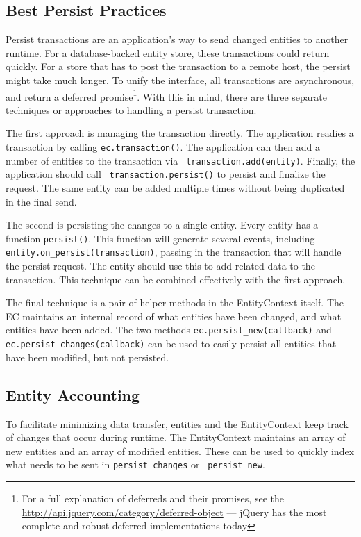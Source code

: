 \documentclass{article}
\newcommand{\ilcode}{\tt}
\begin{document}
\subsection{Best Persist Practices}

Persist transactions are an application's way to send changed entities to
another runtime. For a database-backed entity store, these transactions could
return quickly. For a store that has to post the transaction to a remote host,
the persist might take much longer. To unify the interface, all transactions are
asynchronous, and return a deferred promise\footnote{For a full explanation of
deferreds and their promises, see the \hyperref[jQuery documentation]
{http://api.jquery.com/category/deferred-object} --- jQuery has the most
complete and robust deferred implementations today}. With this in mind, there
are three separate techniques or approaches to handling a persist transaction.

The first approach is managing the transaction directly. The application readies
a transaction by calling {\ilcode ec.transaction()}. The application can then
add a number of entities to the transaction via {\ilcode
transaction.add(entity)}. Finally, the application should call {\ilcode
transaction.persist()} to persist and finalize the request. The same entity can
be added multiple times without being duplicated in the final send.

The second is persisting the changes to a single entity. Every entity has a
function {\ilcode persist()}. This function will generate several events,
including {\ilcode entity.on\_persist(transaction)}, passing in the transaction
that will handle the persist request. The entity should use this to add related
data to the transaction. This technique can be combined effectively with the
first approach.

The final technique is a pair of helper methods in the EntityContext itself. The
EC maintains an internal record of what entities have been changed, and what
entities have been added. The two methods {\ilcode ec.persist\_new(callback)}
and {\ilcode ec.persist\_changes(callback)} can be used to easily persist all
entities that have been modified, but not persisted.

\subsection{Entity Accounting}

To facilitate minimizing data transfer, entities and the EntityContext keep
track of changes that occur during runtime. The EntityContext maintains an array
of new entities and an array of modified entities. These can be used to quickly
index what needs to be sent in {\ilcode persist\_changes} or {\ilcode
persist\_new}.
\end{document}
